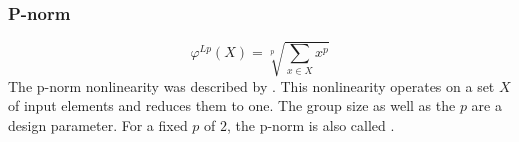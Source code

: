 \subsubsection*{P-norm}
\begin{minipage}{0.45\textwidth}
	\[\varphi^{Lp}(X) = \sqrt[p]{ \sum_{x \in X}{x^p} } \] 
	The p-norm nonlinearity was described by \cite{zhang2014improving}. This nonlinearity operates on a set $X$ of input elements and reduces them to one. The group size as well as the $p$ are a design parameter. For a fixed $p$ of $2$, the p-norm is also called .
\end{minipage}
\hfill
\begin{minipage}{0.45\textwidth}
\end{minipage}

